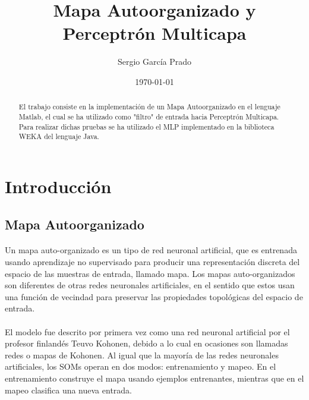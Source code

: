 \documentclass[10pt, a4paper,spanish]{article}
\title{\vspace{-15mm}\fontsize{24pt}{10pt}\selectfont\textbf{Mapa Autoorganizado y \\ Perceptrón Multicapa}} %
\author{Sergio García Prado}
\date{\today}
\begin{document}
	\maketitle %

	\thispagestyle{fancy} %


	\begin{abstract}
		\noindent El trabajo consiste en la implementación de un Mapa Autoorganizado en el lenguaje Matlab, el cual se ha utilizado como "filtro" de entrada hacia Perceptrón Multicapa. Para realizar dichas pruebas se ha utilizado el MLP implementado en la biblioteca WEKA del lenguaje Java.
	\end{abstract}

	\section{Introducción}

		\subsection{Mapa Autoorganizado}

			\paragraph{}
			Un mapa auto-organizado es un tipo de red neuronal artificial, que es entrenada usando aprendizaje no supervisado para producir una representación discreta del espacio de las muestras de entrada, llamado mapa. Los mapas auto-organizados son diferentes de otras redes neuronales artificiales, en el sentido que estos usan una función de vecindad para preservar las propiedades topológicas del espacio de entrada.

			\paragraph{}
			El modelo fue descrito por primera vez como una red neuronal artificial por el profesor finlandés Teuvo Kohonen, debido a lo cual en ocasiones son llamadas redes o mapas de Kohonen. Al igual que la mayoría de las redes neuronales artificiales, los SOMs operan en dos modos: entrenamiento y mapeo. En el entrenamiento construye el mapa usando ejemplos entrenantes, mientras que en el mapeo clasifica una nueva entrada.
\end{document}
